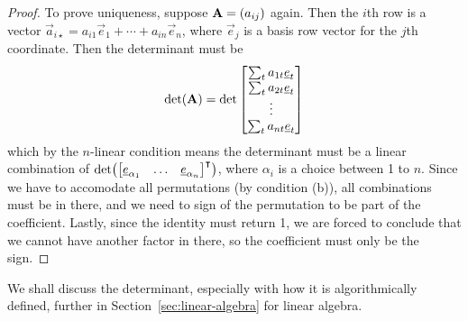 \begin{proof}
    To prove uniqueness, suppose \(\vb{A} = (a_{ij})\) again.
    Then the \(i\)th row is a vector
    \(\vec{a}_{i\star} = a_{i1}\vec{e}_1 + \cdots + a_{in}\vec{e}_n\),
    where \(\vec{e}_j\) is a basis row vector for the \(j\)th coordinate.
    Then the determinant must be
    \begin{equation*}
        \det(\vb{A}) = \det\begin{bmatrix}
            \sum_t a_{1t}\underline{e}_t \\
            \sum_t a_{2t}\underline{e}_t \\
            \vdots \\
            \sum_t a_{nt}\underline{e}_t
        \end{bmatrix}
    \end{equation*}
    which by the \(n\)-linear condition means
    the determinant must be a linear combination of
    \(\det({\mqty[\vec{e}_{\alpha_1} & \hdots & \vec{e}_{\alpha_n}]}^\intercal)\),
    where \(\alpha_i\) is a choice between 1 to \(n\).
    Since we have to accomodate all permutations (by condition (b)),
    all combinations must be in there,
    and we need to sign of the permutation to be part of the coefficient.
    Lastly, since the identity must return 1,
    we are forced to conclude that we cannot have another factor in there,
    so the coefficient must only be the sign.
\end{proof}
\begin{remark}
    We shall discuss the determinant,
    especially with how it is algorithmically defined,
    further in Section~\ref{sec:linear-algebra} for linear algebra.
\end{remark}

